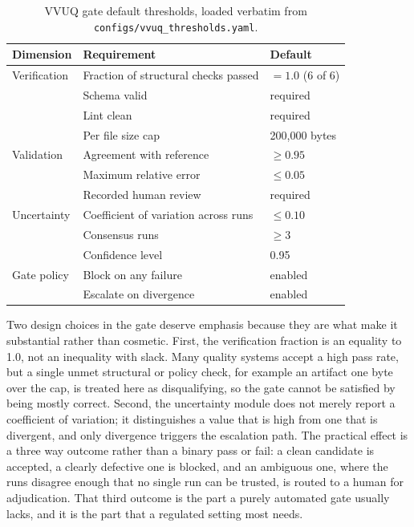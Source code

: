 \begin{table}[H]
\caption{VVUQ gate default thresholds, loaded verbatim from \texttt{configs/vvuq\_thresholds.yaml}.}
\label{tab:methods_thresholds}
\centering
\begin{tabularx}{\textwidth}{L{3.0cm} >{\raggedright\arraybackslash}X C{3.3cm}}
\toprule
\textbf{Dimension} & \textbf{Requirement} & \textbf{Default} \\
\midrule
  Verification & Fraction of structural checks passed & $= 1.0$ (6 of 6) \\
               & Schema valid                         & required \\
               & Lint clean                           & required \\
               & Per file size cap                    & 200{,}000 bytes \\
  \addlinespace
  Validation   & Agreement with reference             & $\geq 0.95$ \\
               & Maximum relative error               & $\leq 0.05$ \\
               & Recorded human review                & required \\
  \addlinespace
  Uncertainty  & Coefficient of variation across runs & $\leq 0.10$ \\
               & Consensus runs                       & $\geq 3$ \\
               & Confidence level                     & 0.95 \\
  \addlinespace
  Gate policy  & Block on any failure                 & enabled \\
               & Escalate on divergence               & enabled \\
\bottomrule
\end{tabularx}
\end{table}

Two design choices in the gate deserve emphasis because they are what make it
substantial rather than cosmetic. First, the verification fraction is an equality
to 1.0, not an inequality with slack. Many quality systems accept a high pass
rate, but a single unmet structural or policy check, for example an artifact one
byte over the cap, is treated here as disqualifying, so the gate cannot be
satisfied by being mostly correct. Second, the uncertainty module does not merely
report a coefficient of variation; it distinguishes a value that is high from one
that is divergent, and only divergence triggers the escalation path. The
practical effect is a three way outcome rather than a binary pass or fail: a clean
candidate is accepted, a clearly defective one is blocked, and an ambiguous one,
where the runs disagree enough that no single run can be trusted, is routed to a
human for adjudication. That third outcome is the part a purely automated gate
usually lacks, and it is the part that a regulated setting most needs.

